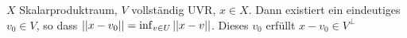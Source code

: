 \documentclass[ngerman]{report}
\begin{document}
	\begin{thm}[Projektionssatz]
		$X$ Skalarproduktraum, $V$ vollständig UVR, $x\in X$. Dann existiert ein eindeutiges $v_0 \in V$, so dass $\left\lvert \left\lvert x - v_0 \right\rvert \right\rvert = \inf_{v\in U} \left\lvert \left\lvert x - v \right\rvert \right\rvert$. Dieses $v_0$ erfüllt $x - v_0 \in V^\perp$	
	\end{thm}

\end{document}

